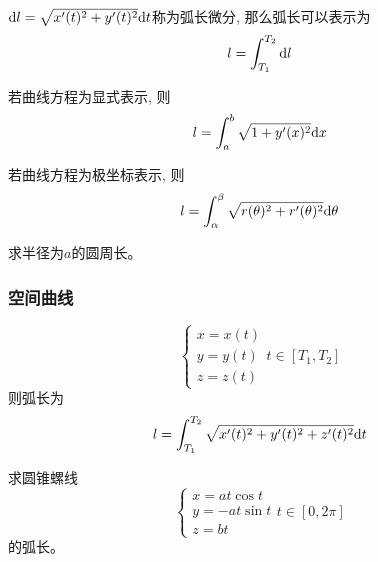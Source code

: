 $\mathrm{d} l = \sqrt{x'(t)^2+y'(t)^2} \mathrm{d} t$称为弧长微分, 那么弧长可以表示为
\begin{equation*}
    l = \int_{T_1}^{T_2}\mathrm{d} l
\end{equation*}

若曲线方程为显式表示, 则
\begin{equation*}
    l = \int_a^b \sqrt{1 + y'(x)^2} \mathrm{d} x
\end{equation*}

若曲线方程为极坐标表示, 则
\begin{equation*}
    l = \int_\alpha^\beta \sqrt{r(\theta)^2 + r'(\theta)^2} \mathrm{d} \theta
\end{equation*}

\begin{example}
    求半径为$a$的圆周长。
\end{example}
\begin{solution}
    
\end{solution}

\subsubsection{空间曲线}
\begin{equation*}
    \begin{cases}
        x = x(t) \\
        y = y(t) \\
        z = z(t)
    \end{cases}
    t \in [T_1, T_2]
\end{equation*}
则弧长为
\begin{equation*}
    l = \int_{T_1}^{T_2} \sqrt{x'(t)^2+y'(t)^2+z'(t)^2} \mathrm{d} t
\end{equation*}

\begin{example}
    求圆锥螺线
    \begin{equation*}
        \begin{cases}
            x = at \cos t \\
            y = -at \sin t \\
            z = bt
        \end{cases}
        t \in [0, 2\pi]
    \end{equation*}
    的弧长。
\end{example}
\begin{solution}
    
\end{solution}


